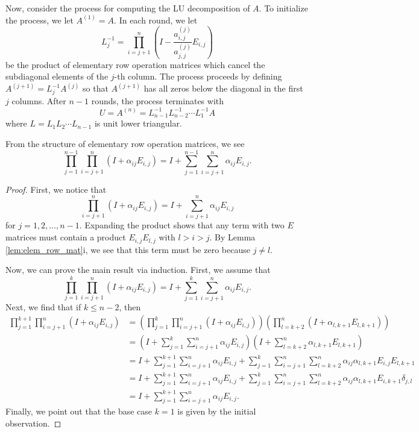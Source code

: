Now, consider the process for computing the LU decomposition of $A$.
To initialize the process, we let $A^{(1)} = A$.
In each round, we let
\[ L_j^{-1} = \prod_{i=j+1}^n \left( I - \frac{a^{(j)}_{i,j}}{a^{(j)}_{j,j}} E_{i,j} \right) \]
be the product of elementary row operation matrices which cancel the subdiagonal elements of the $j$-th column.
The process proceeds by defining $A^{(j+1)} = L_j^{-1} A^{(j)}$ so that $A^{(j+1)}$ has all zeros below the diagonal in the first $j$ columns.
After $n-1$ rounds, the process terminates with
\[ U = A^{(n)} = L_{n-1}^{-1} L_{n-2}^{-1} \cdots L_1^{-1} A \]
where $L = L_1 L_2 \cdots L_{n-1}$ is unit lower triangular.

\begin{lemma}
From the structure of elementary row operation matrices, we see
\[ \prod_{j=1}^{n-1} \prod_{i=j+1}^n \left( I + \alpha_{ij}  E_{i,j} \right)
= I + \sum_{j=1}^{n-1} \sum_{i=j+1}^n \alpha_{ij} E_{i,j}. \]
\end{lemma}
\begin{proof}
First, we notice that
\[ \prod_{i=j+1}^n \left( I + \alpha_{ij}  E_{i,j} \right) = I + \sum_{i=j+1}^n \alpha_{ij} E_{i,j} \]
for $j=1,2,\ldots,n-1$.
Expanding the product shows that any term with two $E$ matrices must contain a product $E_{i,j} E_{l,j}$ with $l>i>j$.
By Lemma \ref{lem:elem_row_mat}i, we see that this term must be zero because $j\neq l$.

Now, we can prove the main result via induction.
First, we assume that
\[ \prod_{j=1}^{k} \prod_{i=j+1}^n \left( I + \alpha_{ij}  E_{i,j} \right)
= I + \sum_{j=1}^{k} \sum_{i=j+1}^n \alpha_{ij} E_{i,j}. \]
Next, we find that if $k \leq n-2$, then
\begin{align*}
\prod_{j=1}^{k+1} \prod_{i=j+1}^n \left( I + \alpha_{ij}  E_{i,j} \right)
& = \left( \prod_{j=1}^{k} \prod_{i=j+1}^n \left( I + \alpha_{ij}  E_{i,j} \right) \right) \left( \prod_{l=k+2}^n \left( I + \alpha_{l,k+1}  E_{l,k+1} \right) \right) \\
& = \left( I + \sum_{j=1}^{k} \sum_{i=j+1}^n \alpha_{ij} E_{i,j} \right) \left( I + \sum_{l=k+2}^n \alpha_{l,k+1}  E_{l,k+1} \right) \\
& = I +  \sum_{j=1}^{k+1} \sum_{i=j+1}^n \alpha_{ij} E_{i,j} + \sum_{j=1}^{k} \sum_{i=j+1}^n \sum_{l=k+2}^n \alpha_{ij} \alpha_{l,k+1} E_{i,j} E_{l,k+1} \\
& = I +  \sum_{j=1}^{k+1} \sum_{i=j+1}^n \alpha_{ij} E_{i,j} + \sum_{j=1}^{k} \sum_{i=j+1}^n \sum_{l=k+2}^n \alpha_{ij} \alpha_{l,k+1} E_{i,k+1} \delta_{j,l} \\
& = I +  \sum_{j=1}^{k+1} \sum_{i=j+1}^n \alpha_{ij} E_{i,j}.
\end{align*}
Finally, we point out that the base case $k=1$ is given by the initial observation.
\end{proof}

